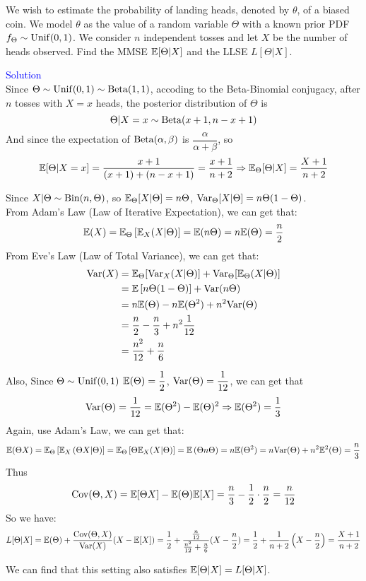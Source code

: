 \begin{homeworkProblem}

We wish to estimate the probability of landing heads, denoted by $\theta$, of a biased coin. We model $\theta$ as the value of a random variable $\Theta$ with a known prior PDF $f_{\Theta} \sim \operatorname{Unif}(0,1)$. We consider $n$ independent tosses and let $X$ be the number of heads observed. Find the MMSE $\mathbb{E}[\Theta | X]$ and the LLSE $L[\Theta | X]$.

\textcolor{blue}{Solution} \\
Since $\Theta\sim\operatorname{Unif}(0,1)\sim \operatorname{Beta}(1,1)$, accoding to the Beta-Binomial conjugacy, after $n$ tosses with $X=x$ heads, the posterior distribution of $\Theta$ is
$$\Theta|X=x\sim\operatorname{Beta}(x+1, n-x+1)$$
And since the expectation of $\operatorname{Beta}(\alpha, \beta)$ is $\dfrac{\alpha}{\alpha + \beta}$, so
$$\mathbb{E}[\Theta|X=x]=\dfrac{x+1}{(x+1)+(n-x+1)}=\dfrac{x+1}{n+2} \Rightarrow \mathbb{E}_{\Theta}[\Theta|X]=\dfrac{X+1}{n+2}$$

Since $X|\Theta\sim\operatorname{Bin}(n, \Theta)$, so $\mathbb{E}_{\Theta}[X|\Theta]=n\Theta$, $\mathrm{Var}_{\Theta}[X|\Theta]=n\Theta(1-\Theta)$. \\
From Adam's Law (Law of Iterative Expectation), we can get that:
$$\mathbb{E}(X)=\mathbb{E}_{\Theta}\left[\mathbb{E}_{X}(X|\Theta)\right]=\mathbb{E}(n\Theta)=n\mathbb{E}(\Theta)=\dfrac{n}{2}$$
From Eve's Law (Law of Total Variance), we can get that:
\begin{align*}
\mathrm{Var}(X) &= \mathbb{E}_{\Theta}[\mathrm{Var}_X(X|\Theta)]+\mathrm{Var}_{\Theta}[\mathbb{E}_{\Theta}(X|\Theta)] \\
&= \mathbb{E}\left[n\Theta(1-\Theta)\right]+\mathrm{Var}(n\Theta) \\
&= n\mathbb{E}(\Theta)-n\mathbb{E}(\Theta^2)+n^2\mathrm{Var}(\Theta) \\
&= \dfrac{n}{2}-\dfrac{n}{3}+n^2\dfrac{1}{12} \\
&=\dfrac{n^2}{12}+\dfrac{n}{6}
\end{align*}

Also, Since $\Theta\sim\operatorname{Unif}(0,1)$ $\mathbb{E}(\Theta)=\dfrac{1}{2}$, $\mathrm{Var}(\Theta)=\dfrac{1}{12}$, we can get that
$$\mathrm{Var}(\Theta)=\dfrac{1}{12}=\mathbb{E}(\Theta^2)-\mathbb{E}(\Theta)^2\Rightarrow\mathbb{E}(\Theta^2)=\dfrac{1}{3}$$
Again, use Adam's Law, we can get that:
$$\mathbb{E}(\Theta X)=\mathbb{E}_{\Theta}\left[\mathbb{E}_{X}\left(\Theta X | \Theta \right)\right]=\mathbb{E}_{\Theta}\left[\Theta\mathbb{E}_{X}(X|\Theta)\right]=\mathbb{E}\left(\Theta n\Theta\right)=n\mathbb{E}(\Theta^2)=n\mathrm{Var}(\Theta)+n^2\mathbb{E}^2(\Theta)=\dfrac{n}{3}$$
Thus
$$\mathrm{Cov}(\Theta, X)=\mathbb{E}[\Theta X]-\mathbb{E}(\Theta)\mathbb{E}[X]=\dfrac{n}{3}-\dfrac{1}{2}\cdot\dfrac{n}{2}=\dfrac{n}{12}$$
So we have:
$$L[\Theta|X]=\mathbb{E}(\Theta)+\dfrac{\mathrm{Cov}(\Theta, X)}{\mathrm{Var}(X)}(X-\mathbb{E}[X])=\dfrac{1}{2}+\dfrac{\frac{n}{12}}{\frac{n^2}{12}+\frac{n}{6}}(X-\frac{n}{2})=\dfrac{1}{2}+\dfrac{1}{n+2}\left(X-\dfrac{n}{2}\right)=\dfrac{X+1}{n+2}$$





We can find that this setting also satisfies $\mathbb{E}[\Theta|X]=L[\Theta|X]$.

\end{homeworkProblem}

\newpage